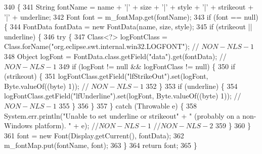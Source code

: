 \begin{DoxyCode}
340                                                                                                        \{
341         String fontName = name + \textcolor{charliteral}{'|'} + size + \textcolor{charliteral}{'|'} + style + \textcolor{charliteral}{'|'} + strikeout + \textcolor{charliteral}{'|'} + underline;
342         Font font = m\_fontMap.get(fontName);
343         \textcolor{keywordflow}{if} (font == null) \{
344             FontData fontData = \textcolor{keyword}{new} FontData(name, size, style);
345             \textcolor{keywordflow}{if} (strikeout || underline) \{
346                 \textcolor{keywordflow}{try} \{
347                     Class<?> logFontClass = Class.forName(\textcolor{stringliteral}{"org.eclipse.swt.internal.win32.LOGFONT"}); \textcolor{comment}{//
      $NON-NLS-1$}
348                     Object logFont = FontData.class.getField(\textcolor{stringliteral}{"data"}).\textcolor{keyword}{get}(fontData); \textcolor{comment}{//$NON-NLS-1$}
349                     \textcolor{keywordflow}{if} (logFont != null && logFontClass != null) \{
350                         \textcolor{keywordflow}{if} (strikeout) \{
351                             logFontClass.getField(\textcolor{stringliteral}{"lfStrikeOut"}).set(logFont, Byte.valueOf((byte) 1)); \textcolor{comment}{//
      $NON-NLS-1$}
352                         \}
353                         \textcolor{keywordflow}{if} (underline) \{
354                             logFontClass.getField(\textcolor{stringliteral}{"lfUnderline"}).set(logFont, Byte.valueOf((byte) 1)); \textcolor{comment}{//
      $NON-NLS-1$}
355                         \}
356                     \}
357                 \} \textcolor{keywordflow}{catch} (Throwable e) \{
358                     System.err.println(\textcolor{stringliteral}{"Unable to set underline or strikeout"} + \textcolor{stringliteral}{" (probably on a
       non-Windows platform). "} + e); \textcolor{comment}{//$NON-NLS-1$ //$NON-NLS-2$}
359                 \}
360             \}
361             font = \textcolor{keyword}{new} Font(Display.getCurrent(), fontData);
362             m\_fontMap.put(fontName, font);
363         \}
364         \textcolor{keywordflow}{return} font;
365     \}
\end{DoxyCode}
